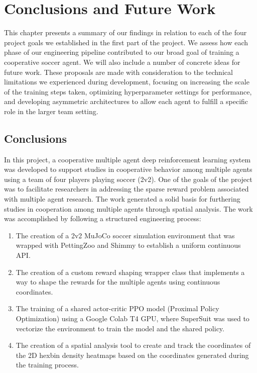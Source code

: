 \chapter{Conclusions and Future Work}
\label{ch:conclusion}

This chapter presents a summary of our findings in relation to each of the four project goals we established in the first part of the project. We assess how each phase of our engineering pipeline contributed to our broad goal of training a cooperative soccer agent.
We will also include a number of concrete ideas for future work. These proposals are made with consideration to the technical limitations we experienced during development, focusing on increasing the scale of the training steps taken, optimizing hyperparameter settings for performance, and developing asymmetric architectures to allow each agent to fulfill a specific role in the larger team setting.

\section{Conclusions}
\label{sec:conclusions}

In this project, a cooperative multiple agent deep reinforcement learning system was developed to support studies in cooperative behavior among multiple agents using a team of four players playing soccer (2v2). One of the goals of the project was to facilitate researchers in addressing the sparse reward problem associated with multiple agent research. The work generated a solid basis for furthering studies in cooperation among multiple agents through spatial analysis. The work was accomplished by following a structured engineering process:
\begin{enumerate}
    \item The creation of a 2v2 MuJoCo soccer simulation environment that was wrapped with PettingZoo and Shimmy to establish a uniform continuous API.
    \item The creation of a custom reward shaping wrapper class that implements a way to shape the rewards for the multiple agents using continuous coordinates.
    \item The training of a shared actor-critic PPO model (Proximal Policy Optimization) using a Google Colab T4 GPU, where SuperSuit was used to vectorize the environment to train the model and the shared policy.
    \item The creation of a spatial analysis tool to create and track the coordinates of the 2D hexbin density heatmaps based on the coordinates generated during the training process.
\end{enumerate}

